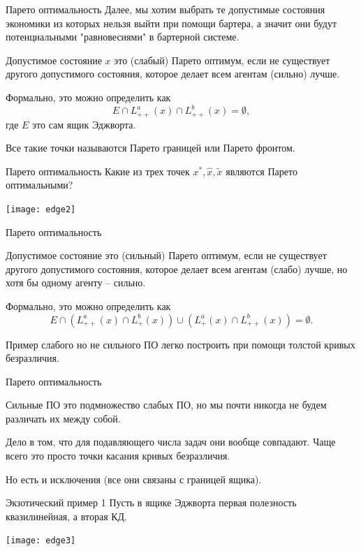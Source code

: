 \documentclass{beamer}
\begin{document}
\begin{frame}{Парето оптимальность}
Далее, мы хотим выбрать те допустимые состояния экономики из которых нельзя выйти при помощи бартера, а значит они будут потенциальными "равновесиями" в бартерной системе.

Допустимое состояние $x$ это \alert{(слабый) Парето оптимум}, если не существует другого допустимого состояния, которое делает всем агентам (сильно) лучше.
	
Формально, это можно определить как $$E \cap L^a_{++}(x) \cap L^b_{++}(x) = \emptyset,$$ где $E$ это сам ящик Эджворта.

Все такие точки называются \alert{Парето границей} или \alert{Парето фронтом}.
\end{frame}


\begin{frame}{Парето оптимальность}
Какие из трех точек $x^{\ast}, \hat x, \tilde x$ являются Парето оптимальными?
  \begin{center}
     \texttt{[image: edge2]}
     \end{center}
\end{frame}

\begin{frame}{Парето оптимальность}

Допустимое состояние это \alert{(сильный) Парето оптимум}, если не существует другого допустимого состояния, которое делает всем агентам (слабо) лучше, но хотя бы одному агенту – сильно.

Формально, это можно определить как $$E \cap (L^a_{++}(x) \cap L^b_{+}(x)) \cup (L^a_{+}(x) \cap L^b_{++}(x))= \emptyset.$$

Пример слабого но не сильного ПО легко построить при помощи толстой кривых безразличия.

\end{frame}

\begin{frame}{Парето оптимальность}

Сильные ПО это подмножество слабых ПО, но мы почти никогда не будем различать их между собой.

Дело в том, что для подавляющего числа задач они вообще совпадают. Чаще всего это просто точки касания кривых безразличия.

Но есть и исключения (все они связаны с границей ящика).
\end{frame}

\begin{frame}{Экзотический пример 1}
Пусть в ящике Эджворта первая полезность квазилинейная, а вторая КД.

\begin{center}
     \texttt{[image: edge3]}
     \end{center}

\end{frame}
\end{document}
